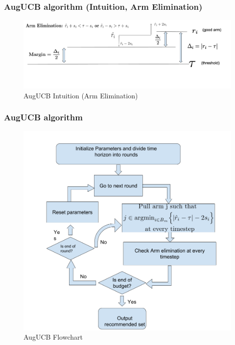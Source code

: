 \begin{frame}
\frametitle{AugUCB algorithm (Intuition, Arm Elimination)}
\begin{figure}
\caption{AugUCB Intuition (Arm Elimination)}
\includegraphics[scale=0.278]{img/ArmElim2.png}
\end{figure}
\end{frame}

\begin{frame}
\frametitle{AugUCB algorithm}
\begin{figure}
\caption{AugUCB Flowchart}
\includegraphics[scale=0.178]{img/AugUCB_flow.png}
\end{figure}
\end{frame}


